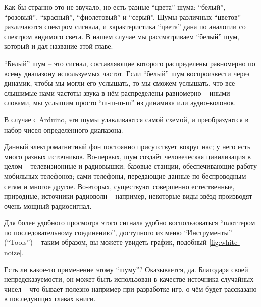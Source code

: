 \documentclass[../sparc.tex]{subfiles}
\begin{document}
Как бы странно это не звучало, но есть разные ``цвета'' шума: ``белый'',
``розовый'', ``красный'', ``фиолетовый'' и ``серый''.  Шумы различных ``цветов''
различаются спектром сигнала, и характеристика ``цвета'' дана по аналогии со
спектром видимого света.  В нашем случае мы рассматриваем ``белый'' шум, который
и дал название этой главе.

``Белый'' шум -- это сигнал, составляющие которого распределены равномерно по
всему диапазону используемых частот.  Если ``белый'' шум воспроизвести через
динамик, чтобы мы могли его услышать, то мы сможем услышать, что все слышимые
нами частоты звука в нём распределены равномерно -- иными словами, мы услышим
просто ``ш-ш-ш-ш'' из динамика или аудио-колонок.


В случае с Arduino, эти шумы улавливаются самой схемой, и преобразуются в набор
чисел определённого диапазона.

Данный электромагнитный фон постоянно присутствует вокруг нас; у него есть много
разных источников.  Во-первых, шум создаёт человеческая цивилизация в целом --
телевизионные и радиовышки; базовые станции, обеспечивающие работу мобильных
телефонов; сами телефоны, передающие данные по беспроводным сетям и многое
другое.  Во-вторых, существуют совершенно естественные, природные, источники
радиоволн -- например, некоторые виды звёзд производят очень мощный радиосигнал.

Для более удобного просмотра этого сигнала удобно воспользоваться ``плоттером по
последовательному соединению'', доступного из меню ``Инструменты'' (``Tools'') --
таким образом, вы можете увидеть график, подобный \ref{fig:white-noize}.



Есть ли какое-то применение этому ``шуму''?  Оказывается, да.  Благодаря своей
непредсказуемости, он может быть использован в качестве источника случайных
чисел -- что бывает полезно например при разработке игр, о чём будет рассказано в
последующих главах книги.
\end{document}
